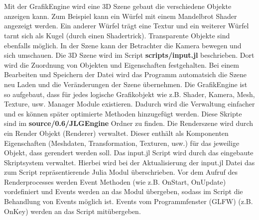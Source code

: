 \documentclass[11pt]{article}
\begin{document}
\endminipage\hfill\\
\endminipage\hfill\\
\newpage
Mit der GrafikEngine wird eine 3D Szene gebaut die verschiedene Objekte anzeigen kann. Zum Beispiel kann ein Würfel mit einem Mandelbrot Shader angezeigt werden. Ein anderer Würfel trägt eine Textur und ein weiterer Würfel tarnt sich als Kugel (durch einen Shadertrick).
Transparente Objekte sind ebenfalls möglich. In der Szene kann der Betrachter die Kamera bewegen und sich umschauen. Die 3D Szene wird im Script \textbf{scripts/input.jl} beschrieben. Dort wird die Zuordnung von Objekten und Eigenschaften festgehalten. Bei einem Bearbeiten und Speichern der Datei wird das Programm automatsich die Szene neu Laden und die Veränderungen der Szene übernehmen. Die GrafikEngine ist so aufgebaut, dass für jedes logische Grafikobjekt wie z.B. Shader, Kamera, Mesh, Texture, usw. Manager Module existieren. Dadurch wird die Verwaltung einfacher und es können später optimierte Methoden hinzugefügt werden. Diese Skripte sind im \textbf{source/0.6/JLGEngine} Ordner zu finden. Die Renderszene wird durch ein Render Objekt (Renderer) verwaltet. Dieser enthält als Komponenten Eigenschaften (Meshdaten, Transformation, Texturen, usw.) für das jeweilige Objekt, dass gerendert werden soll. Das input.jl Script wird durch das eingebaute Skriptsystem verwaltet. Hierbei wird bei der Aktualisierung der input.jl Datei das zum Script repräsentierende Julia Modul überschrieben. Vor dem Aufruf des Renderprocesses werden Event Methoden (wie z.B. OnStart, OnUpdate) vordefiniert und Events werden an das Modul übergeben, sodass im Script die Behandlung von Events möglich ist. Events vom Programmfenster (GLFW) (z.B. OnKey) werden an das Script mitübergeben.
\end{document}
